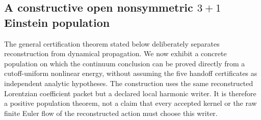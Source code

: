 \documentclass[11pt]{article}
\theoremstyle{definition}
\theoremstyle{remark}
\begin{document}
\subsection{A constructive open nonsymmetric \texorpdfstring{$3+1$}{3+1} Einstein population}
\label{subsec:main-open-3plus1}

The general certification theorem stated below deliberately separates reconstruction from
dynamical propagation.  We now exhibit a concrete population on which the
continuum conclusion can be proved directly from a cutoff-uniform nonlinear
energy, without assuming the five handoff certificates as independent
analytic hypotheses.  The construction uses the same reconstructed
Lorentzian coefficient packet but a declared local harmonic writer.  It is
therefore a positive population theorem, not a claim that every accepted
kernel or the raw finite Euler flow of the reconstructed action must choose
this writer.
\end{document}
